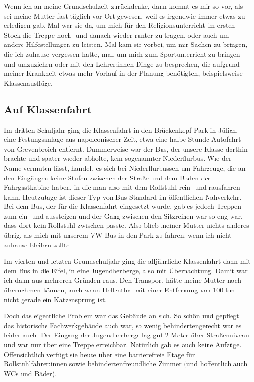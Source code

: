 \documentclass[fontsize=14pt,a4paper,headinclude,DIV=calc,automark]{scrbook}
\begin{document}
Wenn ich an meine Grundschulzeit zurückdenke, dann kommt es mir so vor, als sei meine Mutter fast täglich vor Ort gewesen, weil es irgendwie immer etwas zu erledigen gab. Mal war sie da, um mich für den Religionsunterricht im ersten Stock die Treppe hoch- und danach wieder runter zu tragen, oder auch um andere Hilfestellungen zu leisten. Mal kam sie vorbei, um mir Sachen zu bringen, die ich zuhause vergessen hatte, mal, um mich zum Sportunterricht zu bringen und umzuziehen oder mit den Lehrer:innen Dinge zu besprechen, die aufgrund meiner Krankheit etwas mehr Vorlauf in der Planung benötigten, beispielsweise Klassenausflüge.

\subsection{Auf Klassenfahrt}

Im dritten Schuljahr ging die Klassenfahrt in den Brückenkopf-Park in Jülich, eine Festungsanlage aus napoleonischer Zeit, etwa eine halbe Stunde Autofahrt von Grevenbroich entfernt. Dummerweise war der Bus, der unsere Klasse dorthin brachte und später wieder abholte, kein sogenannter Niederflurbus. Wie der Name vermuten lässt, handelt es sich bei Niederflurbussen um Fahrzeuge, die an den Eingängen keine Stufen zwischen der Straße und dem Boden der Fahrgastkabine haben, in die man also mit dem Rollstuhl rein- und rausfahren kann. Heutzutage ist dieser Typ von Bus Standard im öffentlichen Nahverkehr. Bei dem Bus, der für die Klassenfahrt eingesetzt wurde, gab es jedoch Treppen zum ein- und aussteigen und der Gang zwischen den Sitzreihen war so eng war, dass dort kein Rollstuhl zwischen passte. Also blieb meiner Mutter nichts anderes übrig, als mich mit unserem VW Bus in den Park zu fahren, wenn ich nicht zuhause bleiben sollte.

Im vierten und letzten Grundschuljahr ging die alljährliche Klassenfahrt dann mit dem Bus in die Eifel, in eine Jugendherberge, also mit Übernachtung. Damit war ich dann aus mehreren Gründen raus. Den Transport hätte meine Mutter noch übernehmen können, auch wenn Hellenthal mit einer Entfernung von 100 km nicht gerade ein Katzensprung ist.

Doch das eigentliche Problem war das Gebäude an sich. So schön und gepflegt das historische Fachwerkgebäude auch war, so wenig behindertengerecht war es leider auch. Der Eingang der Jugendherberge lag gut 2 Meter über Straßenniveau und war nur über eine Treppe erreichbar. Natürlich gab es auch keine Aufzüge. Offensichtlich verfügt sie heute über eine barrierefreie Etage für Rollstuhlfahrer:innen sowie behindertenfreundliche Zimmer (und hoffentlich auch WCs und Bäder).
\end{document}
